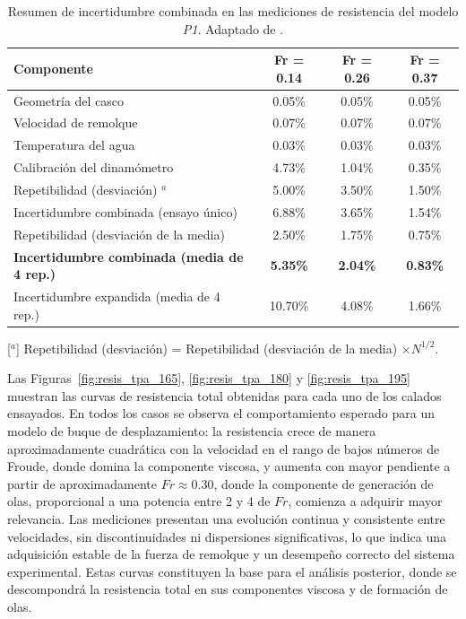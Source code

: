 \begin{table}[H]
\caption{Resumen de incertidumbre combinada en las mediciones de resistencia
del modelo \textit{P1}. Adaptado de \citet{diazojeda2024bulbous}.}
\begin{tabularx}{\textwidth}{lccc}
\toprule
\textbf{Componente} & \textbf{Fr = 0.14} & \textbf{Fr = 0.26} & \textbf{Fr = 0.37} \\
\midrule
Geometría del casco              & 0.05\% & 0.05\% & 0.05\% \\
Velocidad de remolque            & 0.07\% & 0.07\% & 0.07\% \\
Temperatura del agua             & 0.03\% & 0.03\% & 0.03\% \\
Calibración del dinamómetro      & 4.73\% & 1.04\% & 0.35\% \\
Repetibilidad (desviación) $^a$  & 5.00\% & 3.50\% & 1.50\% \\
\midrule
Incertidumbre combinada (ensayo único)
                                 & 6.88\% & 3.65\% & 1.54\% \\
Repetibilidad (desviación de la media)
                                 & 2.50\% & 1.75\% & 0.75\% \\
\textbf{Incertidumbre combinada (media de 4 rep.)}
    & \textbf{5.35\%} & \textbf{2.04\%} & \textbf{0.83\%} \\
Incertidumbre expandida (media de 4 rep.)
                                 & 10.70\% & 4.08\% & 1.66\% \\
\bottomrule
\end{tabularx}
\footnotesize{[$^a$] Repetibilidad (desviación) = Repetibilidad (desviación de
la media) $\times N^{1/2}$.}
\label{tab:uncert_tpa}
\end{table}

Las Figuras~\ref{fig:resis_tpa_165}, \ref{fig:resis_tpa_180} y \ref{fig:resis_tpa_195} muestran las curvas de resistencia total obtenidas para cada uno de los calados ensayados. En todos los casos se observa el comportamiento esperado para un modelo de buque de desplazamiento: la resistencia crece de manera aproximadamente cuadrática con la velocidad en el rango de bajos números de Froude, donde domina la componente viscosa, y aumenta con mayor pendiente a partir de aproximadamente $Fr \approx 0{.}30$, donde la componente de generación de olas, proporcional a una potencia entre 2 y 4 de $Fr$, comienza a adquirir mayor relevancia. Las mediciones presentan una evolución continua y consistente entre velocidades, sin discontinuidades ni dispersiones significativas, lo que indica una adquisición estable de la fuerza de remolque y un desempeño correcto del sistema experimental. Estas curvas constituyen la base para el análisis posterior, donde se descompondrá la resistencia total en sus componentes viscosa y de formación de olas.

